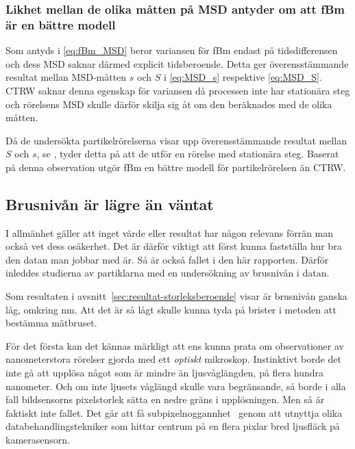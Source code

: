\subsubsection{Likhet mellan de olika måtten på MSD antyder om att fBm är en bättre modell}

Som antyds i \eqref{eq:fBm_MSD} beror variansen för fBm endast på tidsdifferensen och dess MSD saknar därmed explicit tidsberoende. Detta ger överensstämmande resultat mellan MSD-måtten $s$ och $S$ i \eqref{eq:MSD_s} respektive \eqref{eq:MSD_S}. 
CTRW saknar denna egenskap för variansen då processen inte har stationära steg och rörelsens MSD skulle därför skilja sig åt om den beräknades med de olika måtten.

Då de undersökta partikelrörelserna visar upp överensstämmande resultat mellan $S$ och $s$, se , tyder detta på att de utför en rörelse med stationära steg. Baserat på denna observation utgör fBm en bättre modell för partikelrörelsen än CTRW.



\subsection{Brusnivån är lägre än väntat}
I allmänhet gäller att inget värde eller resultat har någon relevans förrän man också vet dess osäkerhet. Det är därför viktigt att först kunna fastställa hur bra den datan man jobbar med är. Så är också fallet i den här rapporten. Därför inleddes studierna av partiklarna med en undersökning av brusnivån i datan. 

Som resultaten i avsnitt~\ref{sec:resultat-storleksberoende} visar är brusnivån ganska låg, omkring \unit[5]{nm}. Att det är så lågt skulle kunna tyda på brister i metoden att bestämma mätbruset. %

För det första kan det kännas märkligt att ens kunna prata om observationer av nanometerstora rörelser gjorda med ett \emph{optiskt} mikroskop. Instinktivt borde det inte gå att upplösa något som är mindre än ljusvåglängden, på flera hundra nanometer. Och om inte ljusets våglängd skulle vara begränsande, så borde i alla fall bildsensorns pixelstorlek sätta en nedre gräns i upplösningen. Men så är faktiskt inte fallet. Det går att få subpixelnoggannhet~\cite{Saunter2010} genom att utnyttja olika databehandlingstekniker som hittar centrum på en flera pixlar bred ljusfläck på kamerasensorn.

